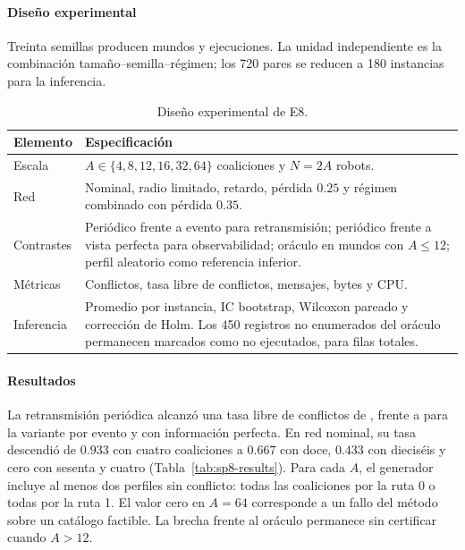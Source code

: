 \paragraph{Diseño experimental}

Treinta semillas producen \SPEightWorlds{} mundos y \SPEightExecutedRuns{} ejecuciones. La unidad independiente es la combinación tamaño--semilla--régimen; los 720 pares se reducen a 180 instancias para la inferencia.

\begin{table}[!htbp]
  \centering
  \caption{Diseño experimental de E8.}
  \label{tab:sp8-design}
  \viutablefont
  \begin{tabularx}{0.94\textwidth}{>{\raggedright\arraybackslash}p{2.4cm} Y}
    \toprule
    Elemento & Especificación \\
    \midrule
    Escala & $A\in\{4,8,12,16,32,64\}$ coaliciones y $N=2A$ robots. \\
    Red & Nominal, radio limitado, retardo, pérdida $0.25$ y régimen combinado con pérdida $0.35$. \\
    Contrastes & Periódico frente a evento para retransmisión; periódico frente a vista perfecta para observabilidad; oráculo en \SPEightCertified{} mundos con $A\leq12$; perfil aleatorio como referencia inferior. \\
    Métricas & Conflictos, tasa libre de conflictos, mensajes, bytes y CPU. \\
    Inferencia & Promedio por instancia, IC \mbox{bootstrap}, Wilcoxon pareado y corrección de Holm. Los 450 registros no enumerados del oráculo permanecen marcados como no ejecutados, para \SPEightRecords{} filas totales. \\
    \bottomrule
  \end{tabularx}
\end{table}

\paragraph{Resultados}

La retransmisión periódica alcanzó una tasa libre de conflictos de \SPEightProposedSuccess{}, frente a \SPEightNaiveSuccess{} para la variante por evento y \SPEightPerfectSuccess{} con información perfecta. En red nominal, su tasa descendió de $0.933$ con cuatro coaliciones a $0.667$ con doce, $0.433$ con dieciséis y cero con sesenta y cuatro (Tabla~\ref{tab:sp8-results}).
Para cada $A$, el generador incluye al menos dos perfiles sin conflicto: todas las coaliciones por la ruta 0 o todas por la ruta 1. El valor cero en $A=64$ corresponde a un fallo del método sobre un catálogo factible. La brecha frente al oráculo permanece sin certificar cuando $A>12$.

